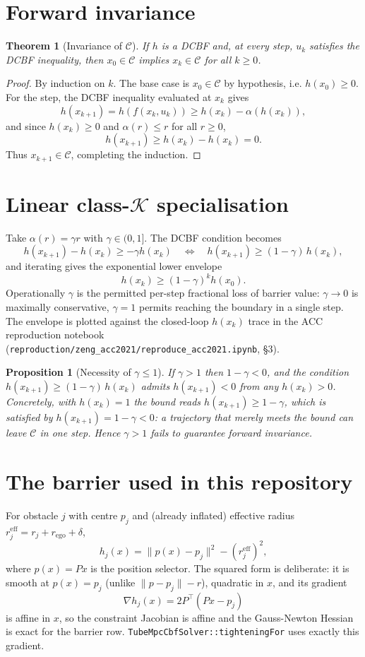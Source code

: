 \documentclass[11pt]{article}
\newtheorem{theorem}{Theorem}
\newtheorem{proposition}{Proposition}
\begin{document}
\section{Forward invariance}
\begin{theorem}[Invariance of $\mathcal{C}$]\label{thm:invariance}
If $h$ is a DCBF and, at every step, $u_k$ satisfies the DCBF inequality, then
$x_0 \in \mathcal{C}$ implies $x_k \in \mathcal{C}$ for all $k \ge 0$.
\end{theorem}
\begin{proof}
By induction on $k$. The base case is $x_0 \in \mathcal{C}$ by hypothesis, i.e. $h(x_0) \ge 0$.
For the step, the DCBF inequality evaluated at $x_k$ gives
\[
h(x_{k+1}) = h(f(x_k, u_k)) \ge h(x_k) - \alpha(h(x_k)),
\]
and since $h(x_k) \ge 0$ and $\alpha(r) \le r$ for all $r \ge 0$,
\[
h(x_{k+1}) \ge h(x_k) - h(x_k) = 0.
\]
Thus $x_{k+1} \in \mathcal{C}$, completing the induction.
\end{proof}

\section{Linear class-$\mathcal{K}$ specialisation}
Take $\alpha(r) = \gamma r$ with $\gamma \in (0,1]$. The DCBF condition becomes
\[
h(x_{k+1}) - h(x_k) \ge -\gamma h(x_k)
\quad\Longleftrightarrow\quad
h(x_{k+1}) \ge (1-\gamma)\, h(x_k),
\]
and iterating gives the exponential lower envelope
\[
h(x_k) \ge (1-\gamma)^k h(x_0).
\]
Operationally $\gamma$ is the permitted per-step fractional loss of barrier value: $\gamma \to 0$
is maximally conservative, $\gamma = 1$ permits reaching the boundary in a single step. The
envelope is plotted against the closed-loop $h(x_k)$ trace in the ACC reproduction notebook
(\texttt{reproduction/zeng\_acc2021/reproduce\_acc2021.ipynb}, \S3).

\begin{proposition}[Necessity of $\gamma \le 1$]
If $\gamma > 1$ then $1 - \gamma < 0$, and the condition $h(x_{k+1}) \ge (1-\gamma)\, h(x_k)$
admits $h(x_{k+1}) < 0$ from any $h(x_k) > 0$. Concretely, with $h(x_k) = 1$ the bound reads
$h(x_{k+1}) \ge 1 - \gamma$, which is satisfied by $h(x_{k+1}) = 1 - \gamma < 0$: a trajectory
that merely meets the bound can leave $\mathcal{C}$ in one step. Hence $\gamma > 1$ fails to
guarantee forward invariance.
\end{proposition}

\section{The barrier used in this repository}
For obstacle $j$ with centre $p_j$ and (already inflated) effective radius
$r_j^{\mathrm{eff}} = r_j + r_{\mathrm{ego}} + \delta$,
\[
h_j(x) = \|p(x) - p_j\|^2 - (r_j^{\mathrm{eff}})^2,
\]
where $p(x) = P x$ is the position selector. The squared form is deliberate: it is smooth at
$p(x) = p_j$ (unlike $\|p - p_j\| - r$), quadratic in $x$, and its gradient
\[
\nabla h_j(x) = 2 P^\top (P x - p_j)
\]
is affine in $x$, so the constraint Jacobian is affine and the Gauss-Newton Hessian is exact for
the barrier row. \texttt{TubeMpcCbfSolver::tighteningFor} uses exactly this gradient.
\end{document}
